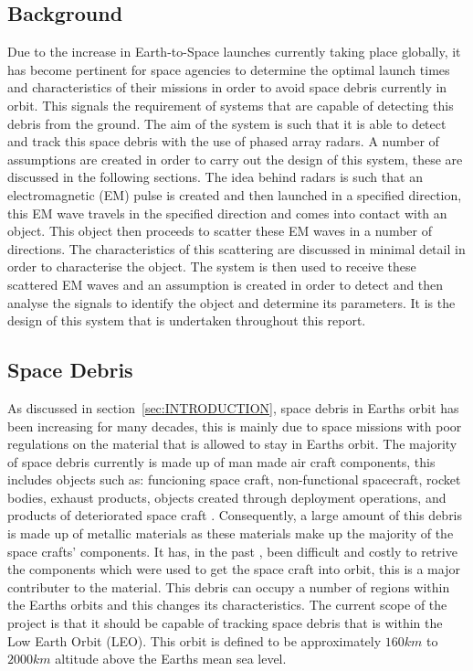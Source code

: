 \documentclass[11pt]{witseiepaper}
\begin{document}
\subsection{Background} \label{sec:Background}
Due to the increase in Earth-to-Space launches currently taking place globally, it has become pertinent for space agencies to determine the optimal launch times and characteristics of their missions in order to avoid space debris currently in orbit. This signals the requirement of systems that are capable of detecting this debris from the ground.
The aim of the system is such that it is able to detect and track this space debris with the use of phased array radars.
A number of assumptions are created in order to carry out the design of this system, these are discussed in the following sections.
The idea behind radars is such that an electromagnetic (EM) pulse is created and then launched in a specified direction, this EM wave travels in the specified direction and comes into contact with an object. This object then proceeds to scatter these EM waves in a number of directions. The characteristics of this scattering are discussed in minimal detail in order to characterise the object. 
The system is then used to receive these scattered EM waves and an assumption is created in order to detect and then analyse the signals to identify the object and determine its parameters.
It is the design of this system that is undertaken throughout this report. 


\subsection{Space Debris} \label{sec:SpaceDebris}
As discussed in section~\ref{sec:INTRODUCTION}, space debris in Earths orbit has been increasing for many decades, this is mainly due to space missions with poor regulations on the material that is allowed to stay in Earths orbit.
The majority of space debris currently is made up of man made air craft components, this includes objects such as: funcioning space craft, non-functional spacecraft, rocket bodies, exhaust products, objects created through deployment operations, and products of deteriorated space craft \cite{OrbitalDebrisTechnicalAssessment}.
Consequently, a large amount of this debris is made up of metallic materials as these materials make up the majority of the space crafts' components.
It has, in the past \cite{Spacex}, been difficult and costly to retrive the components which were used to get the space craft into orbit, this is a major contributer to the material.
This debris can occupy a number of regions within the Earths orbits and this changes its characteristics.
The current scope of the project is that it should be capable of tracking space debris that is within the Low Earth Orbit (LEO). This orbit is defined to be approximately $160 km$ to $2000 km$ altitude above the Earths mean sea level.
\end{document}
